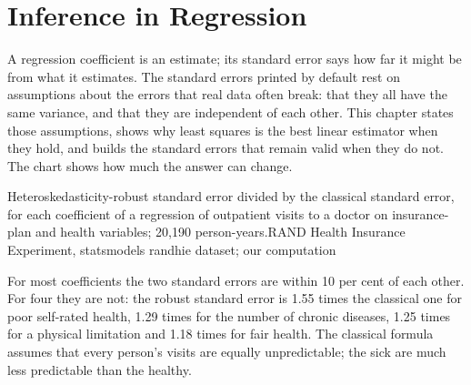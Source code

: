 \chapter{Inference in Regression}\label{ch:b2:regression-inference}

A regression coefficient is an estimate; its standard error says how far it might be from what it estimates. The standard
errors printed by default rest on assumptions about the errors that real data often break: that they all have the same
variance, and that they are independent of each other. This chapter states those assumptions, shows why least squares is
the best linear estimator when they hold, and builds the standard errors that remain valid when they do not. The chart
shows how much the answer can change.

\begin{openingchart}{Heteroskedasticity-robust standard error divided by the classical standard error, for each
  coefficient of a regression of outpatient visits to a doctor on insurance-plan and health variables; 20,190
  person-years.}{RAND Health Insurance Experiment, statsmodels randhie dataset; our computation}
\end{openingchart}

For most coefficients the two standard errors are within 10 per cent of each other. For four they are not: the robust
standard error is 1.55 times the classical one for poor self-rated health, 1.29 times for the number of chronic diseases,
1.25 times for a physical limitation and 1.18 times for fair health. The classical formula assumes that every person's visits are equally
unpredictable; the sick are much less predictable than the healthy.

